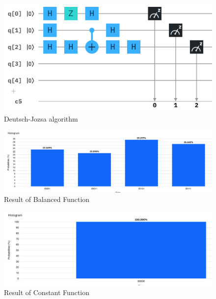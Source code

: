 \documentclass[12pt]{article}
\begin{document}
\begin{figure}[ht]
\begin{minipage}{0.35\linewidth}
            \end{minipage}%
            \begin{minipage}{0.65\linewidth}
                \includegraphics[width=\linewidth]{Circuits/Deutsch-Jozsa.png}
            \end{minipage}
            \caption{Deutsch-Jozsa algorithm}
        \end{figure}
        \begin{figure}[ht]
            \centering
            \includegraphics[width=\linewidth]{Circuits/Deutsch-Jozsa-result.png}
            \caption{Result of Balanced Function}
        \end{figure}
        \begin{figure}
            \centering
            \includegraphics[width=0.6\linewidth]{Circuits/Deutsch-Jozsa-result2.png}
            \caption{Result of Constant Function}
        \end{figure}
\end{document}

